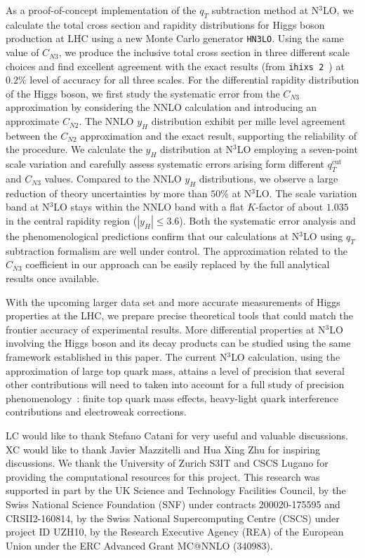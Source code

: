 \documentclass[12pt]{article}
\DeclareRobustCommand{\qt}{q_T}
\DeclareRobustCommand{\qtcut}{\ensuremath{q_T^\mathrm{cut}}}
\begin{document}
As a proof-of-concept implementation of the $\qt$ subtraction method at N$^3$LO,  we calculate the total cross section and rapidity distributions for Higgs boson production at LHC using a new Monte Carlo generator \texttt{HN3LO}. Using the same value of $C_{N3}$, we produce the inclusive total cross section in three different scale choices and find excellent agreement with the exact results (from \texttt{ihixs 2}~\cite{Dulat:2018rbf})  at $0.2\%$ level of accuracy for all three scales. For the differential rapidity distribution of the Higgs boson, we first study the systematic error from the $C_{N3}$ approximation by considering the NNLO calculation and introducing an approximate $C_{N2}$. The NNLO $y_H$ distribution exhibit per mille level agreement between the $C_{N2}$ approximation and the exact result, supporting the reliability of the procedure. 
We calculate the $y_H$ distribution at N$^3$LO employing a seven-point scale variation and carefully assess systematic errors arising form different $\qtcut$ and $C_{N3}$ values. Compared to the NNLO $y_H$ distributions, we observe a large reduction of theory uncertainties by more than $50\%$ at N$^3$LO. The scale variation band at N$^3$LO stays within the NNLO band with a flat $K$-factor of about $1.035$ in the central rapidity region ($|y_H|\leq3.6$). Both the systematic error analysis and the phenomenological predictions confirm that our calculations at N$^3$LO using $\qt$ subtraction formalism are well under control. The approximation related to the $C_{N3}$ coefficient in our approach can be easily replaced by the full analytical results once available. 

With the upcoming larger data set and more accurate measurements of Higgs properties at the LHC, we prepare precise theoretical tools that could match the frontier accuracy of experimental results. More differential properties at N$^3$LO involving the Higgs boson and its decay products can be studied using the same framework established in this paper. The current N$^3$LO calculation, using the approximation of large top quark mass, attains a level of  precision that several 
other contributions will need to taken into account for a full study of precision phenomenology~\cite{Anastasiou:2016cez}: finite top quark mass effects, heavy-light quark interference contributions  
and electroweak corrections. 


LC would like to thank Stefano Catani for very useful and valuable discussions. XC would like to thank Javier Mazzitelli and Hua Xing Zhu for inspiring discussions. We thank the University of Zurich S3IT and CSCS Lugano for providing the computational resources for this project. This research was supported in part by the UK Science and Technology Facilities Council, by the Swiss National Science Foundation (SNF) under contracts 200020-175595 and CRSII2-160814, by the Swiss National Supercomputing Centre (CSCS) under project ID UZH10, by the Research Executive Agency (REA) of the European Union under the ERC Advanced Grant MC@NNLO (340983).
\end{document}
